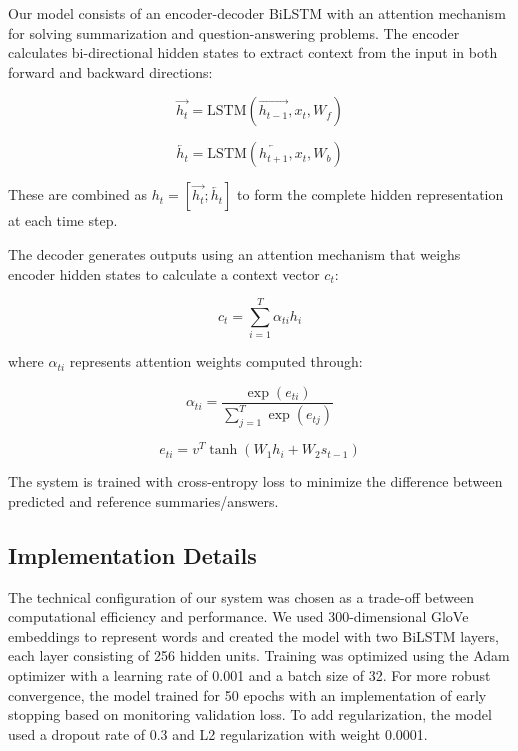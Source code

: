 \documentclass[preprint,12pt]{elsarticle}
\begin{document}
Our model consists of an encoder-decoder BiLSTM with an attention mechanism for solving summarization and question-answering problems. The encoder calculates bi-directional hidden states to extract context from the input in both forward and backward directions:

\begin{equation}
\overrightarrow{h_t} = \text{LSTM}(\overrightarrow{h_{t-1}}, x_t, W_f)
\end{equation}

\begin{equation}
\overleftarrow{h_t} = \text{LSTM}(\overleftarrow{h_{t+1}}, x_t, W_b)
\end{equation}

These are combined as $h_t = [\overrightarrow{h_t}; \overleftarrow{h_t}]$ to form the complete hidden representation at each time step. 

The decoder generates outputs using an attention mechanism that weighs encoder hidden states to calculate a context vector $c_t$:

\begin{equation}
c_t = \sum_{i=1}^{T} \alpha_{ti} h_i
\end{equation}

where $\alpha_{ti}$ represents attention weights computed through:

\begin{equation}
\alpha_{ti} = \frac{\exp(e_{ti})}{\sum_{j=1}^{T} \exp(e_{tj})}
\end{equation}

\begin{equation}
e_{ti} = v^T \tanh(W_1 h_i + W_2 s_{t-1})
\end{equation}

The system is trained with cross-entropy loss to minimize the difference between predicted and reference summaries/answers.

\subsection{Implementation Details}

The technical configuration of our system was chosen as a trade-off between computational efficiency and performance. We used 300-dimensional GloVe embeddings to represent words and created the model with two BiLSTM layers, each layer consisting of 256 hidden units. Training was optimized using the Adam optimizer with a learning rate of 0.001 and a batch size of 32. For more robust convergence, the model trained for 50 epochs with an implementation of early stopping based on monitoring validation loss. To add regularization, the model used a dropout rate of 0.3 and L2 regularization with weight 0.0001. 
\end{document}
